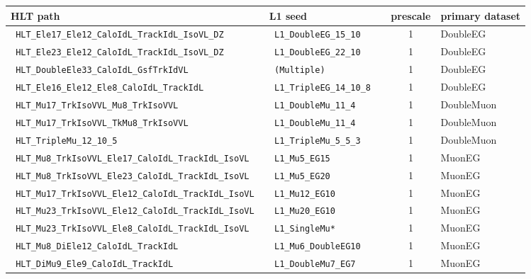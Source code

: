 \begin{table}[h]
\scriptsize
    \centering
    \begin{tabular}{|l|l|c|l|}
\hline %
HLT path                                                       & L1 seed                          & prescale  & primary dataset \\
\hline %
\verb| HLT_Ele17_Ele12_CaloIdL_TrackIdL_IsoVL_DZ       | & \verb| L1_DoubleEG_15_10    |  & 1 & DoubleEG \\
\verb| HLT_Ele23_Ele12_CaloIdL_TrackIdL_IsoVL_DZ       | & \verb| L1_DoubleEG_22_10    |  & 1 & DoubleEG \\
\verb| HLT_DoubleEle33_CaloIdL_GsfTrkIdVL              | & \verb| (Multiple)           |  & 1 & DoubleEG \\
\verb| HLT_Ele16_Ele12_Ele8_CaloIdL_TrackIdL           | & \verb| L1_TripleEG_14_10_8  |  & 1 & DoubleEG \\
\verb| HLT_Mu17_TrkIsoVVL_Mu8_TrkIsoVVL                | & \verb| L1_DoubleMu_11_4     |  & 1 & DoubleMuon \\
\verb| HLT_Mu17_TrkIsoVVL_TkMu8_TrkIsoVVL              | & \verb| L1_DoubleMu_11_4     |  & 1 & DoubleMuon \\
\verb| HLT_TripleMu_12_10_5                            | & \verb| L1_TripleMu_5_5_3    |  & 1 & DoubleMuon \\
\verb| HLT_Mu8_TrkIsoVVL_Ele17_CaloIdL_TrackIdL_IsoVL  | & \verb| L1_Mu5_EG15          |  & 1 & MuonEG \\
\verb| HLT_Mu8_TrkIsoVVL_Ele23_CaloIdL_TrackIdL_IsoVL  | & \verb| L1_Mu5_EG20          |  & 1 & MuonEG \\
\verb| HLT_Mu17_TrkIsoVVL_Ele12_CaloIdL_TrackIdL_IsoVL | & \verb| L1_Mu12_EG10         |  & 1 & MuonEG \\
\verb| HLT_Mu23_TrkIsoVVL_Ele12_CaloIdL_TrackIdL_IsoVL | & \verb| L1_Mu20_EG10         |  & 1 & MuonEG \\
\verb| HLT_Mu23_TrkIsoVVL_Ele8_CaloIdL_TrackIdL_IsoVL  | & \verb| L1_SingleMu*         |  & 1 & MuonEG \\
\verb| HLT_Mu8_DiEle12_CaloIdL_TrackIdL                | & \verb| L1_Mu6_DoubleEG10    |  & 1 & MuonEG \\
\verb| HLT_DiMu9_Ele9_CaloIdL_TrackIdL                 | & \verb| L1_DoubleMu7_EG7     |  & 1 & MuonEG \\

\end{tabular}
\end{table}
